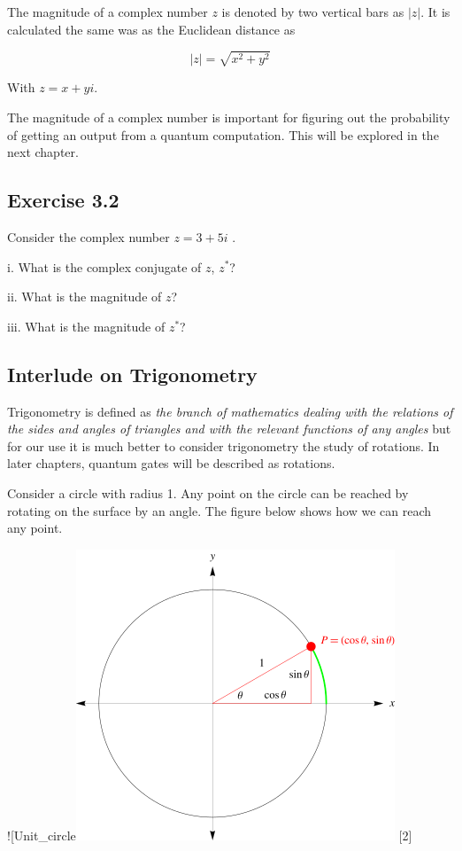 \documentclass{book}
\begin{document}
 The magnitude of a complex number $z$ is denoted by two vertical bars as $|z|$. It is calculated the same was as the Euclidean distance as 

 $$|z| = \sqrt{x^2 + y^2}$$

 With $z = x + yi$. 

 The magnitude of a complex number is important for figuring out the probability of getting an output from a quantum computation. This will be explored in the next chapter.
\hline

\subsection{Exercise 3.2}


Consider the complex number $z = 3 + 5i$ . 

i. What is the complex conjugate of $z$, $z^*$?
 
ii. What is the magnitude of $z$?

iii. What is the magnitude of $z^*$?
\hline
\subsection{ Interlude on Trigonometry } 

Trigonometry is defined as \textit{the branch of mathematics dealing with the relations of the sides and angles of triangles and with the relevant functions of any angles} but for our use it is much better to consider trigonometry the study of rotations. In later chapters, quantum gates will be described as rotations. 

Consider a circle with radius 1. Any point on the circle can be reached by rotating on the surface by an angle. The figure below shows how we can reach any point.

![Unit_circle\includegraphics[scale=0.65]{images/TrigonometryUnitCircle_700.png}
[2]
\end{document}
